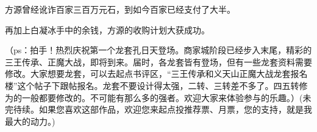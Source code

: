 \begin{this_body}
方源曾经讹诈百家三百万元石，到如今百家已经支付了大半。

再加上白凝冰手中的余钱，方源的收购计划大获成功。

（ps：拍手！热烈庆祝第一个龙套孔日天登场。商家城阶段已经步入末尾，精彩的三王传承、正魔大战，即将到来。届时，各龙套皆有登场，但有一些龙套资料需要修改。大家想要龙套，可以去起点书评区，“三王传承和义天山正魔大战龙套报名楼”这个帖子下跟帖报名。龙套不要设计得太强，二转、三转差不多了。四五转修为的一般都要修改的。不可能有那么多的强者。欢迎大家来体验参与的乐趣。）(未完待续。如果您喜欢这部作品，欢迎您来起点投推荐票、月票，您的支持，就是我最大的动力。)

\end{this_body}

